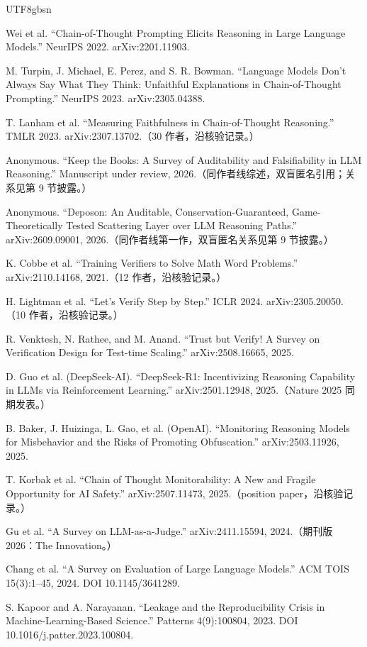 \documentclass[10pt,a4paper]{article}
\begin{document}
\begin{CJK}{UTF8}{gbsn}
\begin{list}{}
\item [{[1]}] Wei et al. ``Chain-of-Thought Prompting Elicits Reasoning in Large Language Models.'' NeurIPS 2022. arXiv:2201.11903.
\item [{[2]}] M. Turpin, J. Michael, E. Perez, and S. R. Bowman. ``Language Models Don't Always Say What They Think: Unfaithful Explanations in Chain-of-Thought Prompting.'' NeurIPS 2023. arXiv:2305.04388.
\item [{[3]}] T. Lanham et al. ``Measuring Faithfulness in Chain-of-Thought Reasoning.'' TMLR 2023. arXiv:2307.13702.（30 作者，沿核验记录。）
\item [{[4]}] Anonymous. ``Keep the Books: A Survey of Auditability and Falsifiability in LLM Reasoning.'' Manuscript under review, 2026.（同作者线综述，双盲匿名引用；关系见第 9 节披露。）
\item [{[5]}] Anonymous. ``Deposon: An Auditable, Conservation-Guaranteed, Game-Theoretically Tested Scattering Layer over LLM Reasoning Paths.'' arXiv:2609.09001, 2026.（同作者线第一作，双盲匿名关系见第 9 节披露。）
\item [{[6]}] K. Cobbe et al. ``Training Verifiers to Solve Math Word Problems.'' arXiv:2110.14168, 2021.（12 作者，沿核验记录。）
\item [{[7]}] H. Lightman et al. ``Let's Verify Step by Step.'' ICLR 2024. arXiv:2305.20050.（10 作者，沿核验记录。）
\item [{[8]}] R. Venktesh, N. Rathee, and M. Anand. ``Trust but Verify! A Survey on Verification Design for Test-time Scaling.'' arXiv:2508.16665, 2025.
\item [{[9]}] D. Guo et al. (DeepSeek-AI). ``DeepSeek-R1: Incentivizing Reasoning Capability in LLMs via Reinforcement Learning.'' arXiv:2501.12948, 2025.（Nature 2025 同期发表。）
\item [{[10]}] B. Baker, J. Huizinga, L. Gao, et al. (OpenAI). ``Monitoring Reasoning Models for Misbehavior and the Risks of Promoting Obfuscation.'' arXiv:2503.11926, 2025.
\item [{[11]}] T. Korbak et al. ``Chain of Thought Monitorability: A New and Fragile Opportunity for AI Safety.'' arXiv:2507.11473, 2025.（position paper，沿核验记录。）
\item [{[12]}] Gu et al. ``A Survey on LLM-as-a-Judge.'' arXiv:2411.15594, 2024.（期刊版 2026：The Innovation。）
\item [{[13]}] Chang et al. ``A Survey on Evaluation of Large Language Models.'' ACM TOIS 15(3):1–45, 2024. DOI 10.1145/3641289.
\item [{[14]}] S. Kapoor and A. Narayanan. ``Leakage and the Reproducibility Crisis in Machine-Learning-Based Science.'' Patterns 4(9):100804, 2023. DOI 10.1016/j.patter.2023.100804.

\end{list}
\end{CJK}
\end{document}
